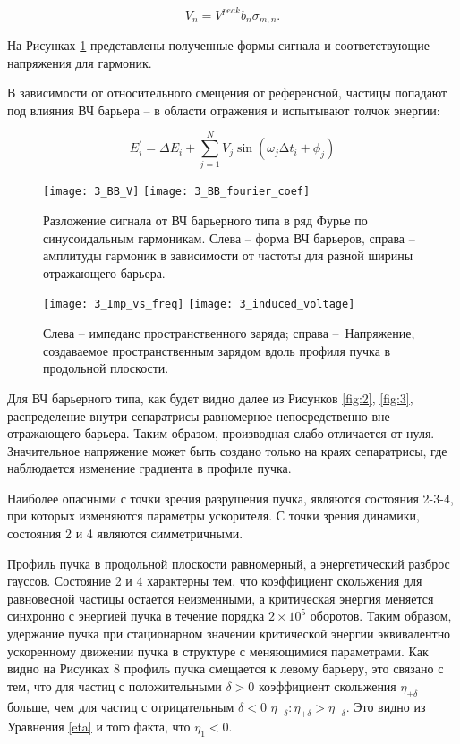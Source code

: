 \begin{equation}
V_n=V^{peak}b_n\sigma_{m, n}.
\label{Volt_n}
\end{equation}

На Рисунках \ref{fig:wave} представлены полученные формы сигнала и со\-от\-вет\-ству\-ющ\-ие напряжения для гармоник.

В зависимости от относительного смещения от референсной, частицы попадают под влияния ВЧ барьера – в области отражения и испытывают толчок энергии:

\begin{equation}
E_i^\prime=\Delta E_i+\sum_{j=1}^{N} V_j\sin{\left(\omega_{j}\mathrm{\Delta}t_i+\phi_j\right)} 
\label{dE}
\end{equation}

\begin{figure}[!h]
   \texttt{[image: 3\_BB\_V]}
   \texttt{[image: 3\_BB\_fourier\_coef]}
   \caption{Разложение сигнала от ВЧ барьерного типа в ряд Фурье по синусоидальным гармоникам. Слева – форма 
   ВЧ барьеров, справа – амплитуды гармоник в зависимости от частоты для разной ширины отражающего барьера.}
   \label{fig:wave}
\end{figure}

\begin{figure}[!h]
   \texttt{[image: 3\_Imp\_vs\_freq]}
   \texttt{[image: 3\_induced\_voltage]}
   \caption{Слева – импеданс пространственного заряда; справа – Напряжение, создаваемое пространственным 
   зарядом вдоль профиля пучка в продольной плоскости. }
   \label{fig:signal}
\end{figure}

\par Для ВЧ барьерного типа, как будет видно далее из Рисунков \ref{fig:2}, \ref{fig:3}, распределение внутри сепаратрисы равномерное непосредственно вне от\-ра\-жа\-ющего барьера. Таким образом, производная слабо отличается от нуля. Значительное напряжение может быть создано только на кра\-ях сепаратрисы, где наблюдается изменение градиента в профиле пучка.

\par Наиболее опасными с точки зрения разрушения пучка, являются со\-сто\-я\-ния 2-3-4, при которых изменяются параметры ускорителя. С точки зрения динамики, состояния 2 и 4 являются симметричными.
\par Профиль пучка в продольной плоскости равномерный, а э\-нер\-ге\-ти\-чес\-кий разброс гауссов. Состояние 2 и 4 характерны тем, что коэффициент скольжения для равновесной частицы остается неизменными, а кри\-ти\-чес\-кая энергия меняется синхронно с энергией пучка в течение порядка $2\times{10}^5$ оборотов. Таким образом, удержание пучка при стационарном значении критической энергии эквивалентно ускоренному движении пуч\-ка в структуре с меняющимися параметрами. Как видно на Рисунках 8 профиль пучка смещается к левому барьеру, это связано с тем, что для частиц с положительными $\delta>0$ коэффициент скольжения $\eta_{+\delta}$ больше, чем для частиц с отрицательным $\delta<0$ $\eta_{-\delta}: \eta_{+\delta}>\eta_{-\delta}$. Это видно из Уравнения \ref{eta} и того факта, что $\eta_1<0$. 

